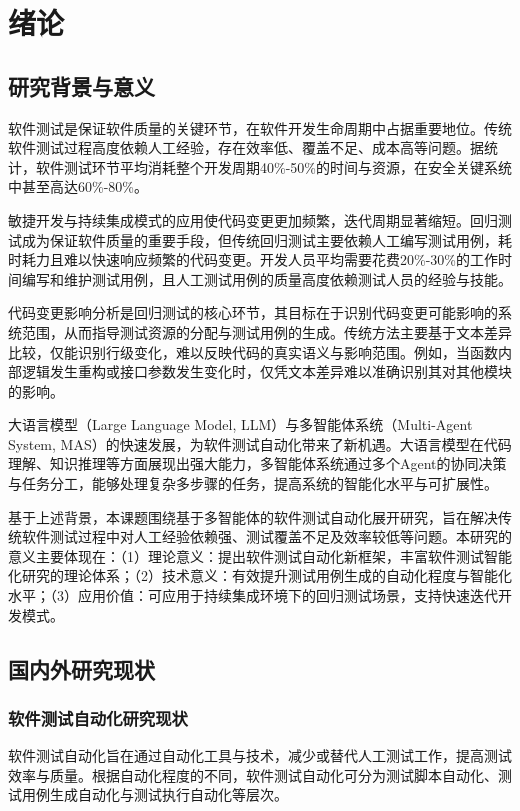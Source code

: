 
\chapter{绪论}
\section{研究背景与意义}
软件测试是保证软件质量的关键环节，在软件开发生命周期中占据重要地位。传统软件测试过程高度依赖人工经验，存在效率低、覆盖不足、成本高等问题。据统计，软件测试环节平均消耗整个开发周期40\%-50\%的时间与资源，在安全关键系统中甚至高达60\%-80\%\cite{Myers2011}。

敏捷开发与持续集成模式的应用使代码变更更加频繁，迭代周期显著缩短。回归测试成为保证软件质量的重要手段，但传统回归测试主要依赖人工编写测试用例，耗时耗力且难以快速响应频繁的代码变更。开发人员平均需要花费20\%-30\%的工作时间编写和维护测试用例，且人工测试用例的质量高度依赖测试人员的经验与技能。

代码变更影响分析是回归测试的核心环节，其目标在于识别代码变更可能影响的系统范围，从而指导测试资源的分配与测试用例的生成。传统方法主要基于文本差异比较，仅能识别行级变化，难以反映代码的真实语义与影响范围。例如，当函数内部逻辑发生重构或接口参数发生变化时，仅凭文本差异难以准确识别其对其他模块的影响。

大语言模型（Large Language Model, LLM）与多智能体系统（Multi-Agent System, MAS）的快速发展，为软件测试自动化带来了新机遇。大语言模型在代码理解、知识推理等方面展现出强大能力，多智能体系统通过多个Agent的协同决策与任务分工，能够处理复杂多步骤的任务，提高系统的智能化水平与可扩展性\cite{Wooldridge2002}。

基于上述背景，本课题围绕基于多智能体的软件测试自动化展开研究，旨在解决传统软件测试过程中对人工经验依赖强、测试覆盖不足及效率较低等问题。本研究的意义主要体现在：（1）理论意义：提出软件测试自动化新框架，丰富软件测试智能化研究的理论体系；（2）技术意义：有效提升测试用例生成的自动化程度与智能化水平；（3）应用价值：可应用于持续集成环境下的回归测试场景，支持快速迭代开发模式。

\section{国内外研究现状}
\subsection{软件测试自动化研究现状}
软件测试自动化旨在通过自动化工具与技术，减少或替代人工测试工作，提高测试效率与质量。根据自动化程度的不同，软件测试自动化可分为测试脚本自动化、测试用例生成自动化与测试执行自动化等层次。

